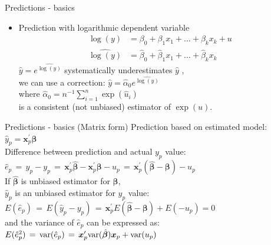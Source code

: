 \documentclass{beamer}
\begin{document}

\begin{frame}{Predictions - basics}
\begin{itemize}
\item Prediction with logarithmic dependent variable
\begin{align}\nonumber
\log(y) &= \beta_0 + \beta_1 x_1 + \dots + \beta_k x_k + u\\\nonumber
\widehat{\log(y)} &= \hat{\beta}_0 + \hat{\beta}_1 x_1 + \dots + \hat{\beta}_k x_k 
\end{align}
$\hat{y} =e^{\widehat{\log(y)}}$ systematically underestimates $\hat{y}$ , \\
\vspace{0.3cm}
we can use a correction: $\hat{y}=\widehat{\alpha}_0 e^{\widehat{\log(y)}}$ \\
\vspace{0.3cm}
where $\widehat{\alpha}_0 = n^{-1} \sum_{i=1}^n \exp(\hat{u}_i)$ \\
\vspace{0.3cm}
is a consistent (not unbiased) estimator of $\exp{(u)}$.
\end{itemize}
\end{frame}

\begin{frame}{Predictions - basics (Matrix form)}
Prediction based on estimated model:\\
\vspace{0.3cm}
$\hat{y}_p = \bm{x}_{p}^\prime \hat{\bm{\beta}}$\\
\vspace{0.3cm}
Difference between prediction and actual $y_p$ value:\\
\vspace{0.3cm}
$\hat{e}_p \,=\, \hat{y}_p - y_p
  \,=\, \bm{x}_{p}^\prime \hat{\bm{\beta}} - \bm{x}_{p}^\prime \bm{\beta} - u_p
  \,=\, \bm{x}_{p}^\prime (\hat{\bm{\beta}} - \bm{\beta}) - u_p$\\
\vspace{0.3cm}
If $\hat{\bm{\beta}}$ is unbiased estimator for $\bm{\beta}$, \\
$\hat{y}_p$ is an unbiased estimator for $y_p$ value:\\
\vspace{0.3cm}
$E(\hat{e}_p) \,=\, E(\hat{y}_p - y_p)
   \,=\, \bm{x}_{p}^\prime E(\hat{\bm{\beta}} - \bm{\beta}) + E(-u_p) =0$\\
\vspace{0.3cm}
and the variance of $\hat{e}_p$ can be expressed as:\\
\vspace{0.3cm}
$E(\hat{e}_p^2) \,=\,\textnormal{var}(\hat{e}_p)
   \,=\, \bm{x}_{p}^\prime \textnormal{var}(\hat{\bm{\beta}})\bm{x}_{p} + \textnormal{var}(u_p) $
\end{frame}
\end{document}
